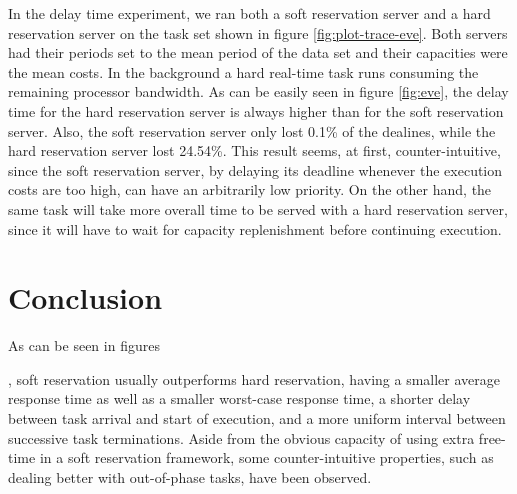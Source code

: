 \documentclass[times, 10pt,twocolumn]{article}
\newcounter{notecounter}
\newcommand{\nota}[1]{\addtocounter{notecounter}{1}{\textcolor{red}{[nota
      \arabic{notecounter}: #1]}}}
\begin{document}
\begin{figure*}[t]
  \centering
  \caption{Delay times for the movie trace.}
  \label{fig:eve}
\end{figure*}


In the delay time experiment, we ran both a soft reservation server
and a hard reservation server on the task set shown in figure
\ref{fig:plot-trace-eve}. Both servers had their periods set to the
mean period of the data set and their capacities were the mean
costs. In the background a hard real-time task runs consuming the
remaining processor bandwidth. As can be easily seen in figure
\ref{fig:eve}, the delay time for the hard reservation server is
always higher than for the soft reservation server. Also, the soft
reservation server only lost 0.1\% of the dealines, while the hard
reservation server lost 24.54\%. This result seems, at first,
counter-intuitive, since the soft reservation server, by delaying its
deadline whenever the execution costs are too high, can have an
arbitrarily low priority. On the other hand, the same task will take
more overall time to be served with a hard reservation server, since
it will have to wait for capacity replenishment before continuing
execution.


\section{Conclusion}
\label{sec:conclusion}

As can be seen in figures \nota{colocar as figuras}, soft reservation
usually outperforms hard reservation, having a smaller average
response time as well as a smaller worst-case response time, a shorter
delay between task arrival and start of execution, and a more uniform
interval between successive task terminations. Aside from the obvious
capacity of using extra free-time in a soft reservation framework,
some counter-intuitive properties, such as dealing better with
out-of-phase tasks, have been observed.




\end{document}
